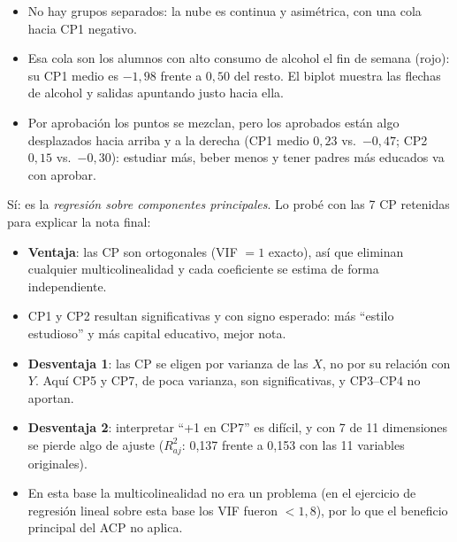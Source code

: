 \begin{itemize}[leftmargin=1.2em]
  \item[\color{cTeal}\faEye] No hay grupos separados: la nube es continua y asimétrica, con una cola hacia
  CP1 negativo.
  \item[\color{cRed}\faEye] Esa cola son los alumnos con alto consumo de alcohol el fin de semana (rojo): su
  CP1 medio es $-1,98$ frente a $0,50$ del resto. El biplot muestra las flechas de alcohol y salidas
  apuntando justo hacia ella.
  \item[\color{cTeal}\faEye] Por aprobación los puntos se mezclan, pero los aprobados están algo desplazados
  hacia arriba y a la derecha (CP1 medio $0,23$ vs.\ $-0,47$; CP2 $0,15$ vs.\ $-0,30$): estudiar más, beber
  menos y tener padres más educados va con aprobar.
\end{itemize}

Sí: es la \emph{regresión sobre componentes principales}. Lo probé con las 7 CP retenidas para explicar la nota
final:
\begin{itemize}[leftmargin=1.2em]
  \item[\color{cTeal}\faPlusCircle] \textbf{Ventaja}: las CP son ortogonales (VIF $=1$ exacto), así que
  eliminan cualquier multicolinealidad y cada coeficiente se estima de forma independiente.
  \item[\color{cTeal}\faPlusCircle] CP1 y CP2 resultan significativas y con signo esperado: más ``estilo
  estudioso'' y más capital educativo, mejor nota.
  \item[\color{cRed}\faMinusCircle] \textbf{Desventaja 1}: las CP se eligen por varianza de las $X$, no por
  su relación con $Y$. Aquí CP5 y CP7, de poca varianza, son significativas, y CP3--CP4 no aportan.
  \item[\color{cRed}\faMinusCircle] \textbf{Desventaja 2}: interpretar ``+1 en CP7'' es difícil, y con 7 de
  11 dimensiones se pierde algo de ajuste ($R^2_{aj}$: 0,137 frente a 0,153 con las 11 variables originales).
  \item[\color{cRed}\faMinusCircle] En esta base la multicolinealidad no era un problema (en el ejercicio de regresión lineal
  sobre esta base los VIF fueron $<1,8$), por lo que el beneficio principal del ACP no aplica.
\end{itemize}


